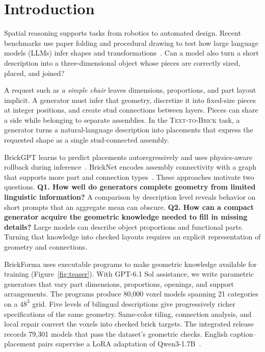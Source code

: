 \section{Introduction}
Spatial reasoning supports tasks from robotics to automated design. Recent benchmarks use paper folding and procedural drawing to test how large language models (LLMs) infer shapes and transformations~\cite{zhou2026paperfolding,luo2026geogrambench}. Can a model also turn a short description into a three-dimensional object whose pieces are correctly sized, placed, and joined?

A request such as \emph{a simple chair} leaves dimensions, proportions, and part layout implicit. A generator must infer that geometry, discretize it into fixed-size pieces at integer positions, and create stud connections between layers. Pieces can share a side while belonging to separate assemblies. In the \textsc{Text-to-Brick} task, a generator turns a natural-language description into placements that express the requested shape as a single stud-connected assembly.

BrickGPT learns to predict placements autoregressively and uses physics-aware rollback during inference~\cite{brickgpt}. BrickNet encodes assembly connectivity with a graph that supports more part and connection types~\cite{bricknet}. These approaches motivate two questions. \textbf{Q1. How well do generators complete geometry from limited linguistic information?} A comparison by description level reveals behavior on short prompts that an aggregate mean can obscure. \textbf{Q2. How can a compact generator acquire the geometric knowledge needed to fill in missing details?} Large models can describe object proportions and functional parts. Turning that knowledge into checked layouts requires an explicit representation of geometry and connections.

BrickForma uses executable programs to make geometric knowledge available for training (Figure~\ref{fig:teaser}). With GPT-6.1 Sol assistance, we write parametric generators that vary part dimensions, proportions, openings, and support arrangements. The programs produce 80,000 voxel models spanning 21 categories on a $48^3$ grid. Five levels of bilingual descriptions give progressively richer specifications of the same geometry. Same-color tiling, connection analysis, and local repair convert the voxels into checked brick targets. The integrated release records 79,301 models that pass the dataset's geometric checks. English caption--placement pairs supervise a LoRA adaptation of Qwen3-1.7B~\cite{qwen3,lora}.

